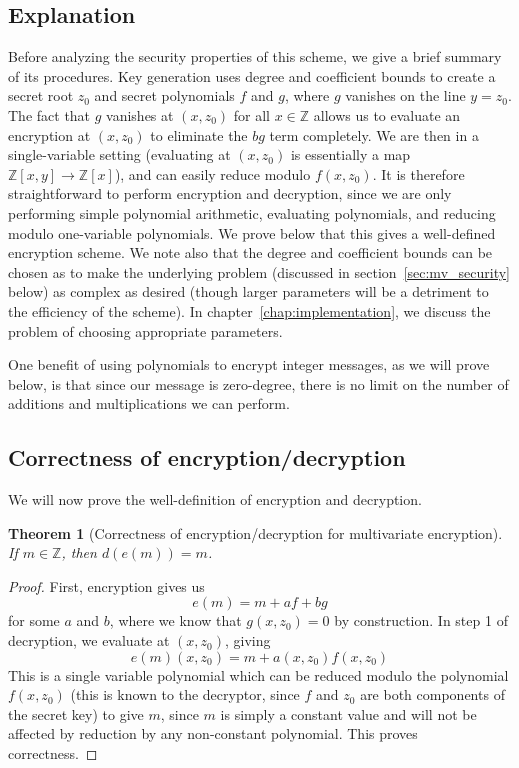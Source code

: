 \documentclass[11pt]{report}
\newtheorem{thm}{Theorem}
\newcommand{\Z}{\mathbb{Z}}
\newcommand{\ra}{\rightarrow}
\newcommand{\Zx}{\mathbb{Z}[x]}
\newcommand{\Zxy}{\mathbb{Z}[x,y]}
\begin{document}
\subsection{Explanation}
Before analyzing the security properties of this scheme, we give a brief summary of its procedures. Key generation uses degree and coefficient bounds to create a secret root $z_0$ and secret polynomials $f$ and $g$, where $g$ vanishes on the line $y=z_0$. The fact that $g$ vanishes at $(x,z_0)$ for all $x\in \Z$ allows us to evaluate an encryption at $(x,z_0)$ to eliminate the $bg$ term completely. We are then in a single-variable setting (evaluating at $(x,z_0)$ is essentially a map $\Zxy \ra \Zx$), and can easily reduce modulo $f(x,z_0)$. It is therefore straightforward to perform encryption and decryption, since we are only performing simple polynomial arithmetic, evaluating polynomials, and reducing modulo one-variable polynomials. We prove below that this gives a well-defined encryption scheme. We note also that the degree and coefficient bounds can be chosen as to make the underlying problem (discussed in section~\ref{sec:mv_security} below) as complex as desired (though larger parameters will be a detriment to the efficiency of the scheme). In chapter~\ref{chap:implementation}, we discuss the problem of choosing appropriate parameters.

One benefit of using polynomials to encrypt integer messages, as we will prove below, is that since our message is zero-degree, there is no limit on the number of additions and multiplications we can perform.


\subsection{Correctness of encryption/decryption}
We will now prove the well-definition of encryption and decryption. 


\begin{thm}[Correctness of encryption/decryption for multivariate encryption] If $m\in \Z$, then $d(e(m)) = m$.
\end{thm}

\begin{proof}
First, encryption gives us
\[e(m) = m+af+bg\]
for some $a$ and $b$, where we know that $g(x,z_0)=0$ by construction. In step 1 of decryption, we evaluate at $(x,z_0)$, giving
\[e(m)(x,z_0) = m+a(x,z_0)f(x,z_0)\]
This is a single variable polynomial which can be reduced modulo the polynomial $f(x,z_0)$ (this is known to the decryptor, since $f$ and $z_0$ are both components of the secret key) to give $m$, since $m$ is simply a constant value and will not be affected by reduction by any non-constant polynomial. This proves correctness.
\end{proof}
\end{document}
